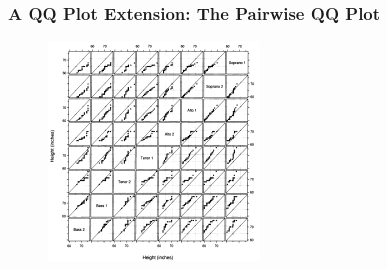 \documentclass[aspectratio=1610]{beamer}
\begin{document}
\begin{frame}
	\frametitle{A QQ Plot Extension: The Pairwise QQ Plot}
	\begin{figure}
		\begin{center}
			\includegraphics[width=0.5\textwidth]{figures/pairwise_qq_plot.png}
		\end{center}
	\end{figure}
\end{frame}
\end{document}
